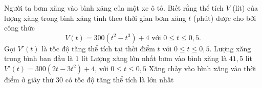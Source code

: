\begin{ex}
	Người ta bơm xăng vào bình xăng của một xe ô tô. Biết rằng thể tích $V$ (lít) của lượng xăng trong bình xăng tính theo thời gian bơm xăng $t$ (phút) được cho bởi công thức $$V(t)=300(t^2-t^3)+4 \text{ với } 0\le t\le 0{,}5.$$
Gọi $V'(t)$ là tốc độ tăng thể tích tại thời điểm $t$ với $0\le t\le 0{,}5$.
\choiceTF
{Lượng xăng trong bình ban đầu là $1$ lít}
{\True Lượng xăng lớn nhất bơm vào bình xăng là $41{,}5$ lít}
{$V'(t)=300(2t-3t^2)+4$, với $0\le t\le 0{,}5$}
{\True Xăng chảy vào bình xăng vào thời điểm ở giây thứ $30$ có tốc độ tăng thể tích là lớn nhất}
\end{ex}

